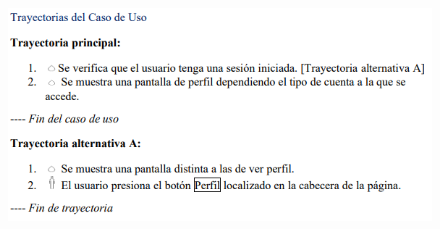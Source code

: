 \documentclass[12pt,letterpaper]{article}
\begin{document}
            \begin{figure}[H]
                \centering
                \includegraphics [scale=0.9]{specs/trayVerPerfil}
            \end{figure}
\end{document}
